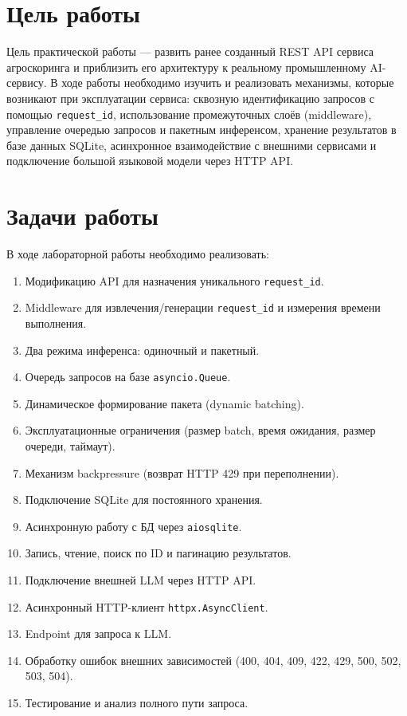 \documentclass[12pt,a4paper]{article}
\begin{document}
\tableofcontents
\newpage

\section{Цель работы}

Цель практической работы — развить ранее созданный REST API сервиса агроскоринга и приблизить его архитектуру к реальному промышленному AI-сервису. В ходе работы необходимо изучить и реализовать механизмы, которые возникают при эксплуатации сервиса: сквозную идентификацию запросов с помощью \texttt{request\_id}, использование промежуточных слоёв (middleware), управление очередью запросов и пакетным инференсом, хранение результатов в базе данных SQLite, асинхронное взаимодействие с внешними сервисами и подключение большой языковой модели через HTTP API.

\section{Задачи работы}

В ходе лабораторной работы необходимо реализовать:
\begin{enumerate}
    \item Модификацию API для назначения уникального \texttt{request\_id}.
    \item Middleware для извлечения/генерации \texttt{request\_id} и измерения времени выполнения.
    \item Два режима инференса: одиночный и пакетный.
    \item Очередь запросов на базе \texttt{asyncio.Queue}.
    \item Динамическое формирование пакета (dynamic batching).
    \item Эксплуатационные ограничения (размер batch, время ожидания, размер очереди, таймаут).
    \item Механизм backpressure (возврат HTTP 429 при переполнении).
    \item Подключение SQLite для постоянного хранения.
    \item Асинхронную работу с БД через \texttt{aiosqlite}.
    \item Запись, чтение, поиск по ID и пагинацию результатов.
    \item Подключение внешней LLM через HTTP API.
    \item Асинхронный HTTP-клиент \texttt{httpx.AsyncClient}.
    \item Endpoint для запроса к LLM.
    \item Обработку ошибок внешних зависимостей (400, 404, 409, 422, 429, 500, 502, 503, 504).
    \item Тестирование и анализ полного пути запроса.
\end{enumerate}
\end{document}
